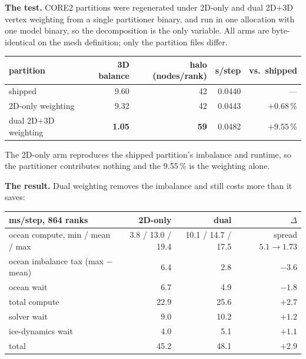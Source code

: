 \documentclass[10pt,a4paper]{article}
\begin{document}
\textbf{The test.} CORE2 partitions were regenerated under 2D-only and dual 2D+3D vertex
weighting from a single partitioner binary, and run in one allocation with one model binary,
so the decomposition is the only variable. All arms are byte-identical on the mesh definition;
only the partition files differ.

\begin{center}\vspace{-4pt}\footnotesize
\begin{tabular}{lrrrr}
\toprule
partition & 3D balance & halo (nodes/rank) & s/step & vs.\ shipped \\
\midrule
shipped & 9.60 & 42 & 0.0440 & --- \\
2D-only weighting & 9.32 & 42 & 0.0443 & $+0.68$\,\% \\
dual 2D+3D weighting & \textbf{1.05} & \textbf{59} & 0.0482 & $\mathbf{+9.55}$\,\% \\
\bottomrule
\end{tabular}\vspace{-4pt}
\end{center}

\noindent
The 2D-only arm reproduces the shipped partition's imbalance and runtime, so the partitioner
contributes nothing and the 9.55\,\% is the weighting alone.

\textbf{The result.} Dual weighting removes the imbalance and still costs more than it saves:

\begin{center}\vspace{-4pt}\footnotesize
\begin{tabular}{lrrr}
\toprule
ms/step, 864 ranks & 2D-only & dual & $\Delta$ \\
\midrule
ocean compute, min / mean / max & 3.8 / 13.0 / 19.4 & 10.1 / 14.7 / 17.5 & spread $5.1\to1.73$ \\
ocean imbalance tax (max $-$ mean) & 6.4 & 2.8 & $-3.6$ \\
ocean wait & 6.7 & 4.9 & $-1.8$ \\
total compute & 22.9 & 25.6 & $+2.7$ \\
solver wait & 9.0 & 10.2 & $+1.2$ \\
ice-dynamics wait & 4.0 & 5.1 & $+1.1$ \\
\midrule
total & 45.2 & 48.1 & $\mathbf{+2.9}$ \\
\bottomrule
\end{tabular}\vspace{-4pt}
\end{center}
\end{document}
